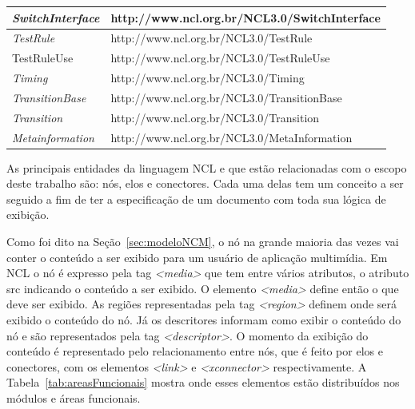 \begin{table}[!ht]
{\begin{tabular}{|p{5cm}|p{10cm}|}
  \textit{SwitchInterface} & http://www.ncl.org.br/NCL3.0/SwitchInterface \\\hline
  \textit{TestRule}  & http://www.ncl.org.br/NCL3.0/TestRule \\\hline
  TestRuleUse & http://www.ncl.org.br/NCL3.0/TestRuleUse \\\hline
  \textit{Timing} & http://www.ncl.org.br/NCL3.0/Timing \\\hline
  \textit{TransitionBase} & http://www.ncl.org.br/NCL3.0/TransitionBase \\\hline
  \textit{Transition} & http://www.ncl.org.br/NCL3.0/Transition \\\hline
  \textit{Metainformation} & http://www.ncl.org.br/NCL3.0/MetaInformation \\\hline
 \end{tabular}
}
\end{table}

As principais entidades da linguagem NCL e que estão relacionadas com o escopo deste trabalho são: nós, elos e conectores. Cada uma delas tem um conceito a ser seguido a fim de ter a especificação de um documento com toda sua lógica de exibição. 

Como foi dito na Seção~\ref{sec:modeloNCM}, o nó na grande maioria das vezes vai conter o conteúdo a ser exibido para um usuário de aplicação multimídia. Em NCL o nó é expresso pela tag \textit{<media>} que tem entre vários atributos, o atributo src indicando o conteúdo a ser exibido. O elemento \textit{<media>} define então o que deve ser exibido. As regiões representadas pela tag \textit{<region>} definem onde será exibido o conteúdo do nó. Já os descritores informam como exibir o conteúdo do nó e são representados pela tag \textit{<descriptor>}. O momento da exibição do conteúdo é representado pelo relacionamento entre nós, que é feito por elos e conectores, com os elementos \textit{<link>} e \textit{<xconnector>} respectivamente. A Tabela~\ref{tab:areasFuncionais} mostra onde esses elementos estão distribuídos nos módulos e áreas funcionais.

